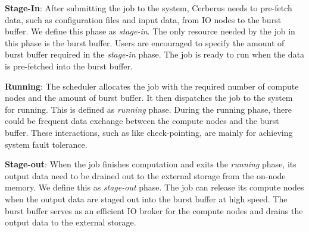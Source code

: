 
\textbf{Stage-In}: After submitting the job to the system,
         Cerberus needs to pre-fetch data, such as configuration files and input data,
         from IO nodes to the burst buffer. We define this phase as \textit{stage-in}.
         The only resource needed by the job in this phase is the burst buffer.
         Users are encouraged to specify the amount of burst buffer required in the \textit{stage-in} phase.
         The job is ready to run when the data is pre-fetched into the burst buffer.
 
\textbf{Running}: The scheduler allocates the job with the required
         number of compute nodes and the amount of burst buffer. 
         It then dispatches the job to the system for running.
         This is defined as \textit{running} phase.
         During the running phase, there could be frequent data exchange
         between the compute nodes and the burst buffer.
         These interactions, such as like check-pointing, are mainly for achieving system fault tolerance. 
 
\textbf{Stage-out}: When the job finishes computation and
         exits the \textit{running} phase, its output data need to be drained out
         to the external storage from the on-node memory. We define this as \textit{stage-out} phase.
         The job can release its compute nodes when the output data are staged out
         into the burst buffer at high speed. The burst buffer serves as an efficient
         IO broker for the compute nodes and drains the output data to the external storage.



